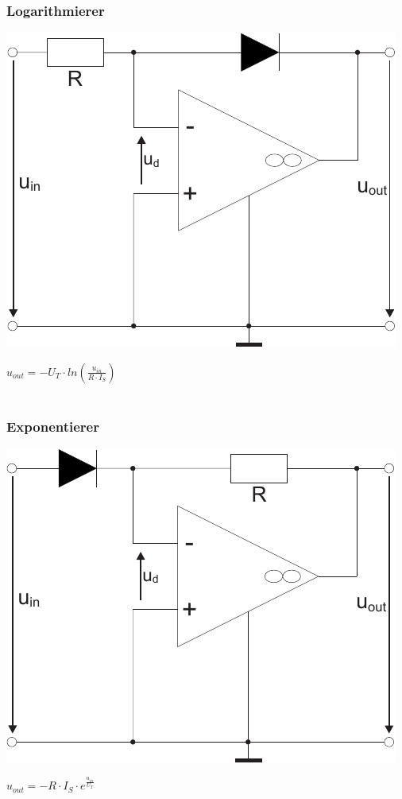 \documentclass[a4paper,twocolumn,10pt]{article}
\begin{document}
\subsubsection*{Logarithmierer}
\begin{minipage}[b]{0.25\textwidth}
\includegraphics[width=\textwidth]{Grafiken/OP_Log}
\end{minipage}
\hfill
\begin{minipage}[b]{0.2\textwidth}
$u_{out}=-U_T\cdot ln(\frac{u_{in}}{R\cdot I_S})$\\\\
\end{minipage}

\subsubsection*{Exponentierer}
\begin{minipage}[b]{0.25\textwidth}
\includegraphics[width=\textwidth]{Grafiken/OP_Exp}
\end{minipage}
\hfill
\begin{minipage}[b]{0.2\textwidth}
$u_{out}=-R\cdot I_S\cdot e^{\frac{u_{in}}{U_T}}$\\\\
\end{minipage}
\end{document}
